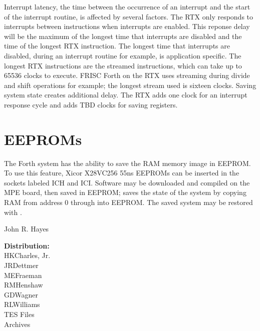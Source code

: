 Interrupt latency, the time between the occurrence of an interrupt
and the start of the interrupt routine, is affected by several factors.
The RTX only responds to interrupts between instructions when
interrupts are enabled.  This reponse delay will be
the maximum of the longest time that interrupts are disabled and
the time of the longest RTX instruction.  The longest time that
interrupts are disabled, during an interrupt routine for example,
is application specific.  The longest RTX instructions are the
streamed instructions, which can take up to 65536 clocks to execute.
FRISC Forth on the RTX uses streaming during divide and shift
operations for example; the longest stream used is sixteen clocks.
Saving system
state creates additional delay.  The RTX adds one clock for an
interrupt response cycle and  adds TBD clocks
for saving registers.

\section{EEPROMs}
The Forth system has the ability to save the RAM memory image in EEPROM.
To use this feature, Xicor X28VC256 55ns EEPROMs can be inserted
in the sockets labeled ICH and ICI.  Software may be downloaded and
compiled on the MPE board, then saved in EEPROM;  saves
the state of the system by copying RAM from address 0 through 
into EEPROM.  The saved system may be restored with .

\vspace{1in}
\hspace{4in}John R. Hayes

\begin{flushleft}
{\bf Distribution:} \\
HKCharles, Jr. \\
JRDettmer \\
MEFraeman \\
RMHenshaw \\
GDWagner \\
RLWilliams \\
TES Files \\
Archives \\
\end{flushleft}

